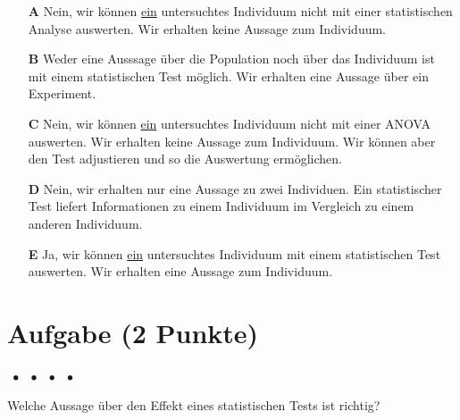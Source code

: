 \documentclass[a4paper, 9pt]{scrartcl}\usepackage[]{graphicx}\usepackage[]{xcolor}
\begin{document}
\begin{enumerate}
\item [\textbf{A} \msquare] Nein, wir können \underline{ein} untersuchtes Individuum nicht mit einer statistischen Analyse auswerten. Wir erhalten keine Aussage zum Individuum.
\item [\textbf{B} \msquare] Weder eine Ausssage über die Population noch über das Individuum ist mit einem statistischen Test möglich. Wir erhalten eine Aussage über ein Experiment.
\item [\textbf{C} \msquare] Nein, wir können \underline{ein} untersuchtes Individuum nicht mit einer ANOVA auswerten. Wir erhalten keine Aussage zum Individuum. Wir können aber den Test adjustieren und so die Auswertung ermöglichen.
\item [\textbf{D} \msquare] Nein, wir erhalten nur eine Aussage zu zwei Individuen. Ein statistischer Test liefert Informationen zu einem Individuum im Vergleich zu einem anderen Individuum.
\item [\textbf{E} \msquare] Ja, wir können \underline{ein} untersuchtes Individuum mit einem statistischen Test auswerten. Wir erhalten eine Aussage zum Individuum.
\end{enumerate}

\section{Aufgabe \hfill (2 Punkte)}

\ifcollection
\begin{flushright}
\tiny\vspace{-2Ex}
\textbf{\examinhaltstart}
\exammodulemathstat $\;\bullet$
\exammodulestat $\;\bullet$
\exammodulestatbbv $\;\bullet$
\exammodulestatversuch $\;\bullet$
\exammodulebiostat
\vspace{-1Ex}
\end{flushright}
\fi




Welche Aussage über den Effekt eines statistischen Tests ist richtig?
\end{document}
